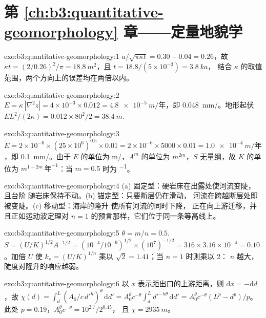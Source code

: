 \section*{第 \ref{ch:b3:quantitative-geomorphology} 章——定量地貌学}

\begin{solution}{exo:b3:quantitative-geomorphology:1}
$a/\sqrt{\pi\kappa t} = 0.30 - 0.04 = 0.26$，故 $\kappa t = (2/0.26)^2/\pi =
\qty{18.8}{m^2}$，且 $t = 18.8/(5\times10^{-3}) = \qty{3.8}{ka}$，
结合 $\kappa$ 的取值范围，两个方向上的误差均在两倍以内。
\end{solution}

\begin{solution}{exo:b3:quantitative-geomorphology:2}
$E = \kappa\,|\nabla^2 z| = 4\times10^{-3}\times0.012 =
\qty{4.8e-5}{m/\text{年}}$，即 \qty{0.048}{mm/}。地形起伏 $E L^2/(2\kappa) =
0.012\times80^2/2 = \qty{38.4}{m}$.
\end{solution}

\begin{solution}{exo:b3:quantitative-geomorphology:3}
$E = 2\times10^{-6}\times(25\times10^6)^{0.5}\times0.01 = 2\times10^{-6}
\times5000\times0.01 = \qty{1.0e-4}{m/\text{年}}$，即 \qty{0.1}{mm/}。由于 $E$ 的单位为
\unit{m/}，$A^m$ 的单位为 $\unit{m}^{2m}$，$S$ 无量纲，故 $K$ 的单位为
$\unit{m}^{1-2m}\,\unit{\text{年}^{-1}}$：当 $m = 0.5$ 时为 \unit{^{-1}}。
\end{solution}

\begin{solution}{exo:b3:quantitative-geomorphology:4}
(a) 固定型：硬岩床在出露处使河流变陡，且台阶
随岩床保持不动。(b) 锚定型：只要断层仍在滑动，
河流在跨越断层处即被变陡。(c) 移动型：海岸的隆升
使所有河流的同时下降，
正在向上游迁移，并且正如运动波定理对 $n
= 1$ 的预言那样，它们位于同一条等高线上。
\end{solution}

\begin{solution}{exo:b3:quantitative-geomorphology:5}
$\theta = m/n = 0.5$. $S = (U/K)^{1/2}A^{-1/2} = (10^{-4}/10^{-9})^{1/2}
\times(10^7)^{-1/2} = 316\times3.16\times10^{-4} = 0.10$。加倍 $U$
使 $k_s = (U/K)^{1/n}$ 乘以 $\sqrt2 = 1.41$；当 $n = 1$ 时则乘以 2：
$n$ 越大，陡度对隆升的响应越弱。
\end{solution}

\begin{solution}{exo:b3:quantitative-geomorphology:6}
以 $x$ 表示距出口的上游距离，则 $\mathrm{d}x = -\mathrm{d}d$，故 $\chi(d)
= \int_d^L (A_0/c\,d'^{h})^{\theta}\,\mathrm{d}d' = A_0^{\theta} c^{-\theta}
\int_d^L d'^{-h\theta}\,\mathrm{d}d' = A_0^{\theta}c^{-\theta}(L^p -
d^p)/p$。此处 $p = 0.19$，$A_0^{\theta}c^{-\theta} = 10^{2.7}/2^{0.45}$，
且 $\chi = \qty{2935}{m}$。
\end{solution}

